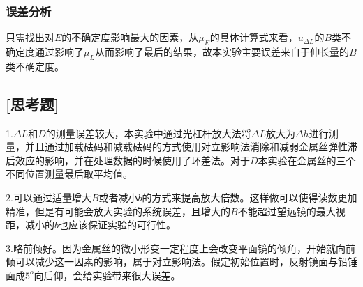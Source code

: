 \documentclass[UTF8]{article}
\begin{document}
\subsubsection*{误差分析}
\par 只需找出对$E$的不确定度影响最大的因素，从$\mu_E$的具体计算式来看，$u_{\Delta  L}$的$B$类不确定度通过影响了$\mu_L$从而影响了最后的结果，故本实验主要误差来自于伸长量的$B$类不确定度。
\subsection*{[思考题]}
\par 1.$\Delta L$和$D$的测量误差较大，本实验中通过光杠杆放大法将$\Delta L$放大为$\Delta h$进行测量，并且通过加载砝码和减载砝码的方式使用对立影响法消除和减弱金属丝弹性滞后效应的影响，并在处理数据的时候使用了环差法。对于$D$本实验在金属丝的三个不同位置测量最后取平均值。
\par 2.可以通过适量增大$B$或者减小$b$的方式来提高放大倍数。这样做可以使得读数更加精准，但是有可能会放大实验的系统误差，且增大的$B$不能超过望远镜的最大视距，减小的$b$也应该保证实验的可行性。
\par 3.略前倾好。因为金属丝的微小形变一定程度上会改变平面镜的倾角，开始就向前倾可以减少这一因素的影响，属于对立影响法。假定初始位置时，反射镜面与铅锤面成$5^o$向后仰，会给实验带来很大误差。
\end{document}
